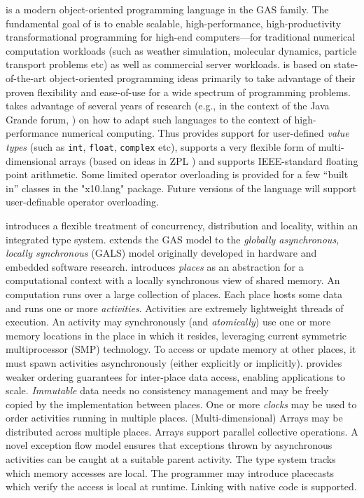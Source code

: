 \Xten{} is a modern object-oriented programming language
in the GAS family. The fundamental goal of \Xten{} is to enable
scalable, high-performance, high-productivity transformational
programming for high-end computers---for traditional numerical
computation workloads (such as weather simulation, molecular dynamics,
particle transport problems etc) as well as commercial server
workloads.
\Xten{} is based on state-of-the-art object-oriented
programming ideas primarily to take advantage of their proven
flexibility and ease-of-use for a wide spectrum of programming
problems. \Xten{} takes advantage of several years of research (e.g.,{}
in the context of the Java Grande forum,
\cite{moreira00java,kava}) on how to adapt such languages to the context of
high-performance numerical computing. Thus \Xten{} provides support
for user-defined {\em value types} (such as {\tt int}, {\tt float},
{\tt complex} etc), supports a very
flexible form of multi-dimensional arrays (based on ideas in ZPL
\cite{zpl}) and supports IEEE-standard floating point arithmetic.
Some limited operator overloading is provided for a few ``built in''
classes in the \xcd"x10.lang" package.  Future versions of the
language will support user-definable operator overloading.

{}\Xten{} introduces a flexible treatment of concurrency, distribution
and locality, within an integrated type system. \Xten{} extends the
GAS model to the {\em globally asynchronous, locally synchronous}
(GALS) model originally developed in hardware and embedded software
research.  {}\Xten{} introduces {\em places} as an abstraction for a
computational context with a locally synchronous view of shared
memory. An \Xten{} computation runs over a large collection of places.
Each place hosts some data and runs one or more {\em
activities}. Activities are extremely lightweight threads of
execution. An activity may synchronously (and {\em atomically}) use
one or more memory locations in the place in which it resides,
leveraging current symmetric multiprocessor (SMP) technology.  
To access or update memory at other places, it must 
spawn activities asynchronously (either explicitly or implicitly).
\Xten{} provides weaker ordering guarantees for
inter-place data access, enabling applications to scale.  {\em
Immutable} data needs no consistency management and may be freely
copied by the implementation between places.  One or more {\em clocks}
may be used to order activities running in multiple
places. (Multi-dimensional) Arrays may be distributed across multiple
places. Arrays support parallel collective operations. A novel
exception flow model ensures that exceptions thrown by asynchronous
activities can be caught at a suitable parent activity.  The type
system tracks which memory accesses are local. The programmer may
introduce placecasts which verify the access is local at runtime.
Linking with native code is supported.

